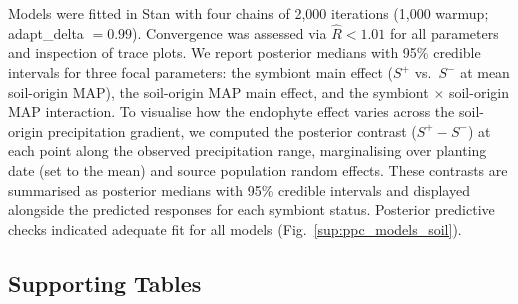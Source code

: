 \documentclass[12pt]{article}\usepackage[]{graphicx}\usepackage[dvipsnames]{xcolor}
\begin{document}
Models were fitted in Stan \citep{Rstan} with four chains of 2,000 iterations (1,000 warmup; adapt\_delta $= 0.99$). Convergence was assessed via $\hat{R} < 1.01$ for all parameters and inspection of trace plots.
We report posterior medians with 95\% credible intervals for three focal parameters: the symbiont main effect ($S^+$ vs.\ $S^-$ at mean soil-origin MAP), the soil-origin MAP main effect, and the symbiont $\times$ soil-origin MAP interaction. 
To visualise how the endophyte effect varies across the soil-origin precipitation gradient, we computed the posterior contrast ($S^+ - S^-$) 
at each point along the observed precipitation range, marginalising over planting date (set to the mean) and source population random effects. 
These contrasts are summarised as posterior medians with 95\% credible intervals and displayed alongside the predicted responses for each symbiont 
status. 
Posterior predictive checks indicated adequate fit for all models (Fig.~\ref{sup:ppc_models_soil}).
\clearpage



\begin{landscape}
\subsection*{Supporting Tables}
\begin{table}[htbp]
    \centering
     \caption{Geographic coordinates and descriptions of source populations for study species. For each source population, the table shows the total number of plants included in the experiment, the number of unique genotypes, and the average clonal replication per genotype.}
    \small
    
       \label{tab:source_pop}
\end{table}
\end{landscape}
\clearpage


\begin{table}[ht]
    \centering
    \caption{Summary of symbiont removal treatments by species and population.
    N indicates the number of plants tested for symbiont status and
    \%$S^+$ indicates the proportion that tested positive.
    Treatment refers to the symbiont removal treatment applied to the seed lineage: Control (no treatment) or Heat (5 days in a drying oven at 60\degree C for \emph{E. virginicus} and \emph{P. autumnalis}; 12 min in a 60\degree C water bath for \emph{A. hyemalis}).
    For all populations except SFAEF and PALM, heat-treated seed lineages were one or more generations removed from the treatment; for those two populations, plants from heat-treated seeds were used directly in the experiment.}
    \label{tab:heat_treatment}
    
\end{table}
\clearpage
\end{document}
